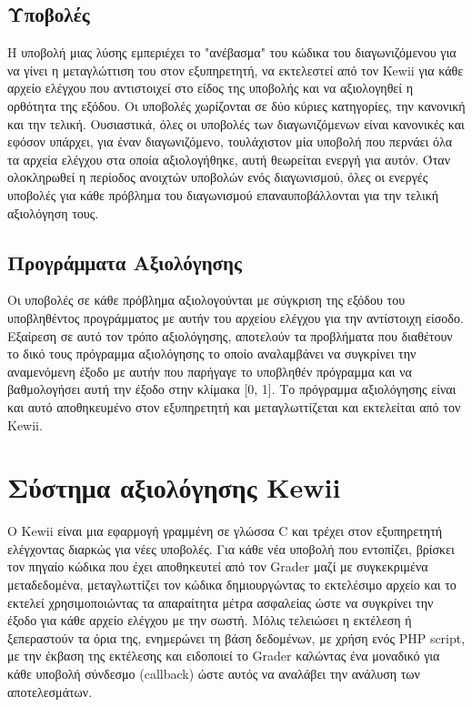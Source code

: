 \documentclass[diploma]{softlab-thesis}
\begin{document}
\subsection{Υποβολές}

Η υποβολή μιας λύσης εμπεριέχει το "ανέβασμα" του κώδικα του διαγωνιζόμενου για
να γίνει η μεταγλώττιση του στον εξυπηρετητή, να εκτελεστεί από τον Kewii για
κάθε αρχείο ελέγχου που αντιστοιχεί στο είδος της υποβολής και να αξιολογηθεί η
ορθότητα της εξόδου. Οι υποβολές χωρίζονται σε δύο κύριες κατηγορίες, την
κανονική και την τελική. Ουσιαστικά, όλες οι υποβολές των διαγωνιζόμενων είναι
κανονικές και εφόσον υπάρχει, για έναν διαγωνιζόμενο, τουλάχιστον μία υποβολή
που περνάει όλα τα αρχεία ελέγχου στα οποία αξιολογήθηκε, αυτή θεωρείται ενεργή
για αυτόν. Όταν ολοκληρωθεί η περίοδος ανοιχτών υποβολών ενός διαγωνισμού, όλες
οι ενεργές υποβολές για κάθε πρόβλημα του διαγωνισμού επαναυποβάλλονται για την
τελική αξιολόγηση τους.

\subsection{Προγράμματα Αξιολόγησης}

Οι υποβολές σε κάθε πρόβλημα αξιολογούνται με σύγκριση της εξόδου του υποβληθέντος
προγράμματος με αυτήν του αρχείου ελέγχου για την αντίστοιχη είσοδο. Εξαίρεση σε
αυτό τον τρόπο αξιολόγησης, αποτελούν τα προβλήματα που διαθέτουν το δικό τους
πρόγραμμα αξιολόγησης το οποίο αναλαμβάνει να συγκρίνει την αναμενόμενη έξοδο
με αυτήν που παρήγαγε το υποβληθέν πρόγραμμα και να βαθμολογήσει αυτή την έξοδο
στην κλίμακα [0, 1]. Το πρόγραμμα αξιολόγησης είναι και αυτό αποθηκευμένο στον
εξυπηρετητή και μεταγλωττίζεται και εκτελείται από τον Kewii.


\section{Σύστημα αξιολόγησης Kewii}

Ο Kewii είναι μια εφαρμογή γραμμένη σε γλώσσα C και τρέχει στον εξυπηρετητή
ελέγχοντας διαρκώς για νέες υποβολές. Για κάθε νέα υποβολή που εντοπίζει,
βρίσκει τον πηγαίο κώδικα που έχει αποθηκευτεί από τον Grader μαζί με συγκεκριμένα
μεταδεδομένα, μεταγλωττίζει τον κώδικα δημιουργώντας το εκτελέσιμο αρχείο και το
εκτελεί χρησιμοποιώντας τα απαραίτητα μέτρα ασφαλείας ώστε να συγκρίνει την έξοδο
για κάθε αρχείο ελέγχου με την σωστή. Μόλις τελειώσει η εκτέλεση ή ξεπεραστούν τα
όρια της, ενημερώνει τη βάση δεδομένων, με χρήση ενός PHP script, με την έκβαση της
εκτέλεσης και ειδοποιεί το Grader καλώντας ένα μοναδικό για κάθε υποβολή σύνδεσμο
(callback) ώστε αυτός να αναλάβει την ανάλυση των αποτελεσμάτων.
\end{document}
